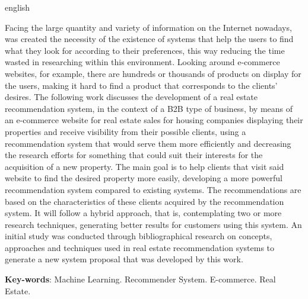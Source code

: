 \begin{resumo}[Abstract]
 \begin{otherlanguage*}{english}

Facing the large quantity and variety of information on the Internet nowadays, was created the necessity of the existence of systems that help the users to find what they look for according to their preferences, this way reducing the time wasted in researching within this environment. Looking around e-commerce websites, for example, there are hundreds or thousands of products on display for the users, making it hard to find a product that corresponds to the clients' desires. The following work discusses the development of a real estate recommendation system, in the context of a B2B type of business, by means of an e-commerce website for real estate sales for housing companies displaying their properties and receive visibility from their possible clients, using a recommendation system that would serve them more efficiently and decreasing the research efforts for something that could suit their interests for the acquisition of a new property. The main goal is to help clients that visit said website to find the desired property more easily, developing a more powerful recommendation system compared to existing systems. The recommendations are based on the characteristics of these clients acquired by the recommendation system. It will follow a hybrid approach, that is, contemplating two or more research techniques, generating better results for customers using this system. An initial study was conducted through bibliographical research on concepts, approaches and techniques used in real estate recommendation systems to generate a new system proposal that was developed by this work.

   \vspace{\onelineskip}
 
   \noindent 
   \textbf{Key-words}: Machine Learning. Recommender System. E-commerce. Real Estate.
 \end{otherlanguage*}
\end{resumo}
